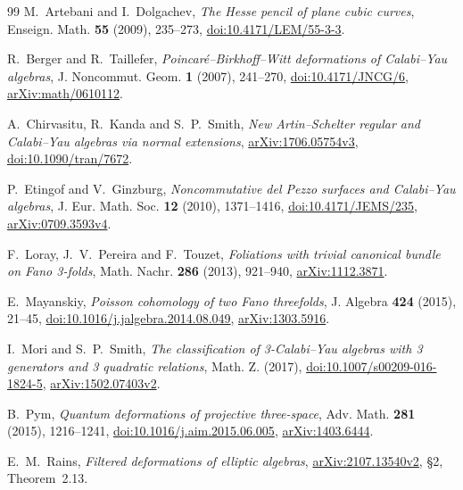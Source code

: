 \documentclass[11pt,a4paper]{ltjsarticle}
\numberwithin{equation}{section}
\begin{document}
\begin{thebibliography}{99}
M.~Artebani and I.~Dolgachev,
\textit{The Hesse pencil of plane cubic curves},
Enseign. Math. \textbf{55} (2009), 235--273,
\href{https://doi.org/10.4171/LEM/55-3-3}{doi:10.4171/LEM/55-3-3}.

R.~Berger and R.~Taillefer,
\textit{Poincar\'e--Birkhoff--Witt deformations of Calabi--Yau algebras},
J. Noncommut. Geom. \textbf{1} (2007), 241--270,
\href{https://doi.org/10.4171/JNCG/6}{doi:10.4171/JNCG/6},
\href{https://arxiv.org/abs/math/0610112}{arXiv:math/0610112}.

A.~Chirvasitu, R.~Kanda and S.~P.~Smith,
\textit{New Artin--Schelter regular and Calabi--Yau algebras via normal extensions},
\href{https://arxiv.org/abs/1706.05754}{arXiv:1706.05754v3},
\href{https://doi.org/10.1090/tran/7672}{doi:10.1090/tran/7672}.

P.~Etingof and V.~Ginzburg,
\textit{Noncommutative del Pezzo surfaces and Calabi--Yau algebras},
J. Eur. Math. Soc. \textbf{12} (2010), 1371--1416,
\href{https://doi.org/10.4171/JEMS/235}{doi:10.4171/JEMS/235},
\href{https://arxiv.org/abs/0709.3593}{arXiv:0709.3593v4}.

F.~Loray, J.~V.~Pereira and F.~Touzet,
\textit{Foliations with trivial canonical bundle on Fano 3-folds},
Math. Nachr. \textbf{286} (2013), 921--940,
\href{https://arxiv.org/abs/1112.3871}{arXiv:1112.3871}.

E.~Mayanskiy,
\textit{Poisson cohomology of two Fano threefolds},
J. Algebra \textbf{424} (2015), 21--45,
\href{https://doi.org/10.1016/j.jalgebra.2014.08.049}{doi:10.1016/j.jalgebra.2014.08.049},
\href{https://arxiv.org/abs/1303.5916}{arXiv:1303.5916}.

I.~Mori and S.~P.~Smith,
\textit{The classification of 3-Calabi--Yau algebras with 3 generators and 3 quadratic relations},
Math. Z. (2017),
\href{https://doi.org/10.1007/s00209-016-1824-5}{doi:10.1007/s00209-016-1824-5},
\href{https://arxiv.org/abs/1502.07403}{arXiv:1502.07403v2}.

B.~Pym,
\textit{Quantum deformations of projective three-space},
Adv. Math. \textbf{281} (2015), 1216--1241,
\href{https://doi.org/10.1016/j.aim.2015.06.005}{doi:10.1016/j.aim.2015.06.005},
\href{https://arxiv.org/abs/1403.6444}{arXiv:1403.6444}.

E.~M.~Rains,
\textit{Filtered deformations of elliptic algebras},
\href{https://arxiv.org/abs/2107.13540}{arXiv:2107.13540v2},
\S2, Theorem~2.13.


\end{thebibliography}
\end{document}
